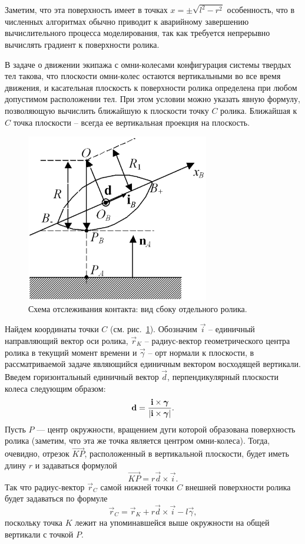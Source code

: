 Заметим, что эта поверхность имеет  в 
точках $x=\pm \sqrt{l^2 - r^2}$ особенность, что в численных алгоритмах обычно приводит к аварийному завершению вычислительного процесса моделирования, так как требуется непрерывно вычислять градиент к поверхности ролика.

В задаче о движении экипажа с омни-колесами конфигурация системы твердых тел такова, что плоскости омни-колес остаются вертикальными во все время движения, и касательная плоскость к поверхности ролика определена при любом допустимом расположении тел. При этом условии можно указать явную формулу, позволяющую вычислить ближайшую к плоскости точку $C$ ролика. Ближайшая к $C$ точка плоскости -- всегда ее вертикальная проекция на плоскость.

\begin{figure}[htb]
    \centering
    \includegraphics[width=8cm]{content/parts/3_friction/nd/RollerSection_d_ib.png}
    \caption{Схема отслеживания контакта: вид сбоку отдельного ролика.}
    \label{ContactScheme}
\end{figure}

Найдем координаты точки $C$ (см. рис.~\ref{ContactScheme}). Обозначим $\vec{i}$ -- единичный направляющий вектор оси ролика, $\vec{r}_K$ -- радиус-вектор геометрического центра ролика в текущий момент времени и $\vec{\gamma}$ -- орт нормали к плоскости, в рассматриваемой задаче являющийся единичным вектором восходящей вертикали. Введем горизонтальный единичный вектор $\vec{d}$, перпендикулярный плоскости колеса следующим образом:
$$
    \boldsymbol{\mathbf{d}} = \displaystyle\frac{\displaystyle \boldsymbol{\mathbf{i}} \times \boldsymbol{\mathbf{\gamma}}}{\displaystyle \left| \boldsymbol{\mathbf{i}} \times \boldsymbol{\mathbf{\gamma}} \right|}.
$$
Пусть $P$ --- центр окружности, вращением дуги которой образована поверхность ролика (заметим, что эта же точка является центром омни-колеса). Тогда, очевидно, отрезок $\overrightarrow{KP}$, расположенный в вертикальной
плоскости, будет иметь длину $r$ и задаваться формулой
$$
    \overrightarrow{KP} = r\vec{d} \times \vec{i}.
$$
Так что радиус-вектор $\vec{r}_C$ самой нижней точки $C$ внешней поверхности ролика будет задаваться по формуле
\begin{equation}
    \vec{r}_C = \vec{r}_K + r\vec{d} \times \vec{i} - l\vec{\gamma},
\label{3_2_0}
\end{equation}
поскольку точка $K$ лежит на упоминавшейся выше окружности на общей вертикали с точкой $P$.

